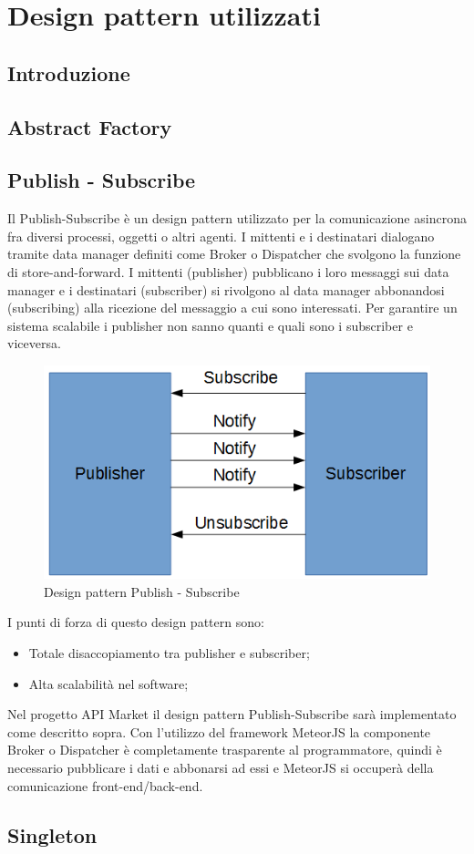 \newpage
\section{Design pattern utilizzati}

\subsection{Introduzione}

\subsection{Abstract Factory}

\subsection{Publish - Subscribe}
Il Publish-Subscribe è un design pattern utilizzato per la comunicazione asincrona fra diversi processi, oggetti o altri agenti. I mittenti e i destinatari dialogano tramite data manager definiti come Broker o Dispatcher che svolgono la funzione di store-and-forward.
I mittenti (publisher) pubblicano i loro messaggi sui data manager e i destinatari (subscriber) si rivolgono al data manager abbonandosi (subscribing) alla ricezione del messaggio a cui sono interessati. Per garantire un sistema scalabile i publisher non sanno quanti e quali sono i subscriber e viceversa.
\begin{figure}[h]
	\centering
	\includegraphics[width=0.5\linewidth]{IMG/pubsub}
	\caption{Design pattern Publish - Subscribe}
\end{figure}
I punti di forza di questo design pattern sono:
\begin{itemize}
	\item Totale disaccopiamento tra publisher e subscriber;
	\item Alta scalabilità nel software;
\end{itemize}

Nel progetto API Market il design pattern Publish-Subscribe sarà implementato come descritto sopra. Con l'utilizzo del framework MeteorJS la componente Broker o Dispatcher è completamente trasparente al programmatore, quindi è necessario pubblicare i dati e abbonarsi ad essi e MeteorJS si occuperà della comunicazione front-end/back-end.

\subsection{Singleton}